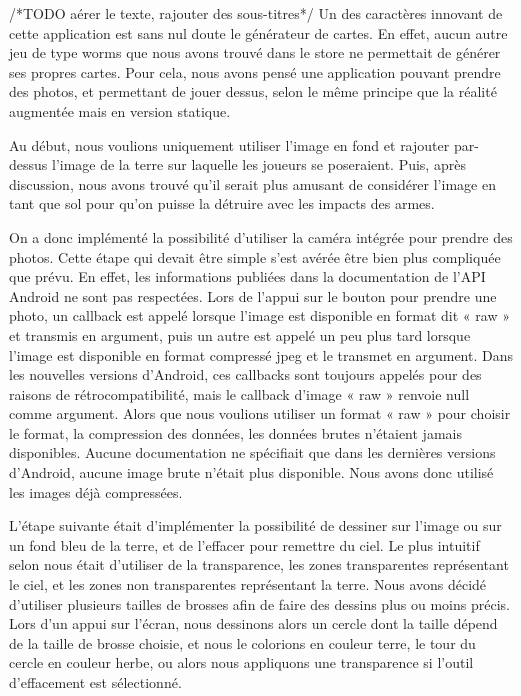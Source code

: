\documentclass{report}
\begin{document}
/*TODO aérer le texte, rajouter des sous-titres*/
Un des caractères innovant de cette application est sans nul doute le générateur de cartes.
En effet, aucun autre jeu de type worms que nous avons trouvé dans le store ne permettait de générer ses propres cartes. Pour cela, nous avons pensé une application pouvant prendre des photos, et permettant de jouer dessus, selon le même principe que la réalité augmentée mais en version statique.

Au début, nous voulions uniquement utiliser l'image en fond et rajouter par-dessus l'image de la terre sur laquelle les joueurs se poseraient. Puis, après discussion, nous avons trouvé qu'il serait plus amusant de considérer l'image en tant que sol pour qu'on puisse la détruire avec les impacts des armes.


On a donc implémenté la possibilité d'utiliser la caméra intégrée pour prendre des photos. Cette étape qui devait être simple s'est avérée être bien plus compliquée que prévu. En effet, les informations publiées dans la documentation de l'API Android ne sont pas respectées. Lors de l'appui sur le bouton pour prendre une photo, un callback est appelé lorsque l'image est disponible en format dit « raw » et transmis en argument, puis un autre est appelé un peu plus tard lorsque l'image est disponible en format compressé jpeg et le transmet en argument. Dans les nouvelles versions d'Android, ces callbacks sont toujours appelés pour des raisons de rétrocompatibilité, mais le callback d'image « raw » renvoie null comme argument. Alors que nous voulions utiliser un format « raw » pour choisir le format, la compression des données, les données brutes n'étaient jamais disponibles. Aucune documentation ne spécifiait que dans les dernières versions d'Android, aucune image brute n'était plus disponible. Nous avons donc utilisé les images déjà compressées.


L'étape suivante était d'implémenter la possibilité de dessiner sur l'image ou sur un fond bleu de la terre, et de l’effacer pour remettre du ciel. Le plus intuitif selon nous était d'utiliser de la transparence, les zones transparentes représentant le ciel, et les zones non transparentes représentant la terre. Nous avons décidé d'utiliser plusieurs tailles de brosses afin de faire des dessins plus ou moins précis. Lors d’un appui sur l’écran, nous dessinons alors un cercle dont la taille dépend de la taille de brosse choisie, et nous le colorions en couleur terre, le tour du cercle en couleur herbe, ou alors nous appliquons une transparence si l’outil d’effacement est sélectionné.
\end{document}
